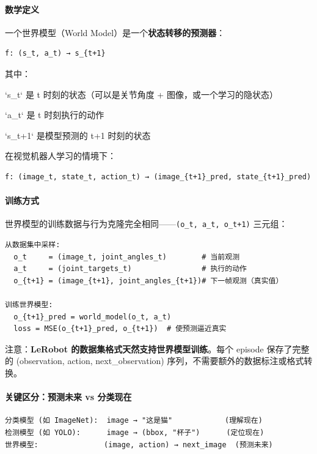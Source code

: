 \documentclass[UTF8,a4paper,11pt]{ctexart}
\begin{document}
\paragraph{数学定义}


一个世界模型（World Model）是一个\textbf{状态转移的预测器}：

\begin{lstlisting}[language=text]
f: (s_t, a_t) → s_{t+1}
\end{lstlisting}

其中：
\item `s_t` 是 t 时刻的状态（可以是关节角度 + 图像，或一个学习的隐状态）
\item `a_t` 是 t 时刻执行的动作
\item `s_{t+1}` 是模型预测的 t+1 时刻的状态

在视觉机器人学习的情境下：

\begin{lstlisting}[language=text]
f: (image_t, state_t, action_t) → (image_{t+1}_pred, state_{t+1}_pred)
\end{lstlisting}

\paragraph{训练方式}


世界模型的训练数据与行为克隆完全相同——\texttt{(o_t, a_t, o_{t+1})} 三元组：

\begin{lstlisting}[language=text]
从数据集中采样:
  o_t     = (image_t, joint_angles_t)        # 当前观测
  a_t     = (joint_targets_t)                # 执行的动作
  o_{t+1} = (image_{t+1}, joint_angles_{t+1})# 下一帧观测（真实值）

训练世界模型:
  o_{t+1}_pred = world_model(o_t, a_t)
  loss = MSE(o_{t+1}_pred, o_{t+1})  # 使预测逼近真实
\end{lstlisting}

注意：\textbf{LeRobot 的数据集格式天然支持世界模型训练}。每个 episode 保存了完整的 (observation, action, next_observation) 序列，不需要额外的数据标注或格式转换。

\paragraph{关键区分：预测未来 vs 分类现在}


\begin{lstlisting}[language=text]
分类模型 (如 ImageNet):  image → "这是猫"            (理解现在)
检测模型 (如 YOLO):      image → (bbox, "杯子")      (定位现在)
世界模型:               (image, action) → next_image  (预测未来)
\end{lstlisting}
\end{document}
